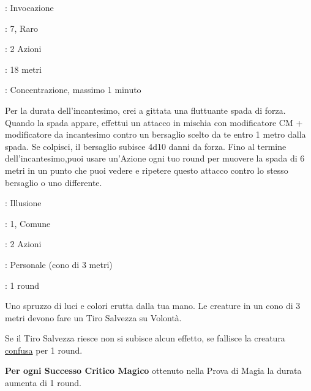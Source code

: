 \begin{multicols}{2}
\noindent\colorbox{OBSSgold!10}{
\begin{minipage}{0.95\linewidth}
\begin{description}[noitemsep, topsep=0pt, parsep=0pt, partopsep=0pt, leftmargin=0cm, labelwidth=1.3cm]
	\item[\textbf{Lista}]: Invocazione
	\item[\textbf{Livello}]: 7, Raro
	\item[\textbf{Lancio}]: 2 Azioni
	\item[\textbf{Gittata}]: 18 metri
	\item[\textbf{Durata}]: Concentrazione, massimo 1 minuto
\end{description}
\end{minipage}}\smallskip

Per la durata dell'incantesimo, crei a gittata una fluttuante spada di forza. Quando la spada appare, effettui un attacco in mischia con modificatore CM + modificatore da incantesimo contro un bersaglio scelto da te entro 1 metro dalla spada. Se colpisci, il bersaglio subisce 4d10 danni da forza. Fino al termine dell'incantesimo,puoi usare un'Azione ogni tuo round per muovere la spada di 6 metri in un punto che puoi vedere e ripetere questo attacco contro lo stesso bersaglio o uno differente.

\noindent\colorbox{OBSSgold!10}{
\begin{minipage}{0.95\linewidth}
\begin{description}[noitemsep, topsep=0pt, parsep=0pt, partopsep=0pt, leftmargin=0cm, labelwidth=1.3cm]
	\item[\textbf{Lista}]: Illusione
	\item[\textbf{Livello}]: 1, Comune
	\item[\textbf{Lancio}]: 2 Azioni
	\item[\textbf{Gittata}]: Personale (cono di 3 metri)
	\item[\textbf{Durata}]: 1 round
\end{description}
\end{minipage}}\smallskip

Uno spruzzo di luci e colori erutta dalla tua mano. Le creature in un cono di 3 metri devono fare un Tiro Salvezza su Volontà.

Se il Tiro Salvezza riesce non si subisce alcun effetto, se fallisce la creatura \hyperlink{confusionecondizione}{confusa} per 1 round.

\textbf{Per ogni Successo Critico Magico} ottenuto nella Prova di Magia la durata aumenta di 1 round.


\end{multicols}
